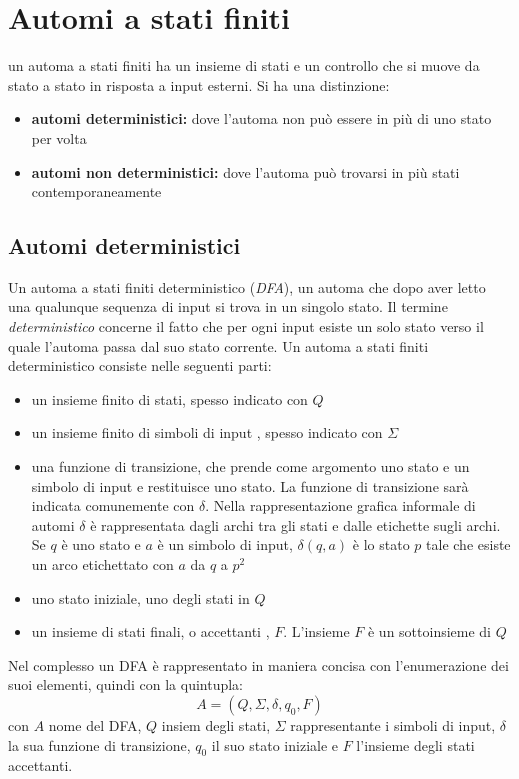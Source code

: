 \section{Automi a stati finiti}\label{sec:automi-stati-finiti}

un automa a stati finiti ha un insieme di stati e un controllo che si muove da stato a stato in risposta a input esterni. Si ha una distinzione:
\begin{itemize}
	\item \textbf{automi deterministici:} dove l'automa non può essere in più di uno stato per volta
	\item \textbf{automi non deterministici:} dove l'automa può trovarsi in più stati contemporaneamente
\end{itemize}

\subsection{Automi deterministici}
Un automa a stati finiti deterministico (\textit{DFA}), un automa che dopo aver letto una qualunque sequenza di input si trova in un singolo stato. Il termine \textit{deterministico} concerne il fatto che per ogni input esiste un solo stato verso il quale l'automa passa dal suo stato corrente. Un automa a stati finiti deterministico consiste nelle seguenti parti:
\begin{itemize}
	\item un insieme finito di stati, spesso indicato con $Q$
	\item un insieme finito di simboli di input , spesso indicato con $\Sigma$
	\item una funzione di transizione, che prende come argomento uno stato e un simbolo di input e restituisce uno stato. La funzione di transizione sarà indicata comunemente con $\delta$. Nella rappresentazione grafica informale di automi $\delta$ è rappresentata dagli archi tra gli stati e dalle etichette sugli archi. Se $q$ è uno stato e $a$ è un simbolo di input, $\delta(q,a)$ è lo stato $p$ tale che esiste un arco etichettato con $a$ da $q$ a $p^2$
	\item uno stato iniziale, uno degli stati in $Q$
	\item un insieme di stati finali, o accettanti , $F$. L'insieme $F$ è un sottoinsieme di $Q$
\end{itemize}
Nel complesso un DFA è rappresentato in maniera concisa con l'enumerazione dei suoi elementi, quindi con la quintupla:
$$A=(Q,\Sigma,\delta,q_0,F)$$
con $A$ nome del DFA, $Q$ insiem degli stati, $\Sigma$ rappresentante i simboli di input, $\delta$ la sua funzione di transizione, $q_0$ il suo stato iniziale e $F$ l'insieme degli stati accettanti.\\
